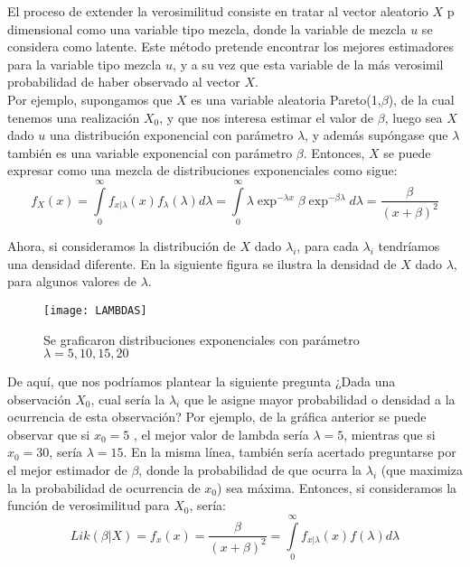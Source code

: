 \documentclass[11pt]{book}
\begin{document}
El proceso de extender la verosimilitud consiste en tratar al vector aleatorio $X$ p dimensional como una variable tipo mezcla, donde la variable de mezcla $u$ se considera como latente. Este método pretende encontrar los mejores estimadores para la variable tipo mezcla $u$, y a su vez que esta variable de la más verosimil probabilidad de haber observado al vector $X$.\\ 

\pagebreak
Por ejemplo, supongamos que $X$ es una variable aleatoria Pareto(1,$\beta$), de la cual tenemos  una realización $X_{0} $, y que nos interesa estimar el valor de $ \beta$, luego sea $X$ dado $u$ una distribución exponencial con parámetro $\lambda$, y además supóngase que $ \lambda$ también es una variable exponencial con parámetro $\beta $. Entonces, $X$ se puede expresar como una mezcla de distribuciones exponenciales como sigue:\\
\begin{equation*}
f_{X}(x)=\underset{0}{\overset{\infty }{\int }}f_{x|\lambda}(x)f_{\lambda}(\lambda)d\lambda=\underset{0}{\overset{\infty }{\int }} \lambda \exp^{-\lambda x} \beta \exp^{-\beta \lambda} d\lambda=\dfrac{\beta}{(x+\beta)^{2}}
\end{equation*}


Ahora, si consideramos la distribución de $ X$ dado $\lambda_{i}$, para cada $\lambda_{i}$ tendríamos una densidad diferente. En la siguiente figura se ilustra la densidad de $X$ dado $\lambda$, para algunos valores de $ \lambda$.\\

\begin{figure}[h]
\centering
\texttt{[image: LAMBDAS]}
\caption{Se graficaron distribuciones exponenciales con parámetro $\lambda=5, 10, 15, 20$}
\end{figure}

De aquí, que nos podríamos plantear la siguiente pregunta ¿Dada una observación $ X_0$, cual sería la $ \lambda_{i}$ que le asigne mayor probabilidad o densidad a la ocurrencia de esta observación? Por ejemplo, de la gráfica anterior se puede observar que si $x_{0}=5$ , el mejor valor de lambda sería $\lambda=5$, mientras que si $x_{0}=30$, sería $\lambda=15$. En la misma línea, también sería acertado preguntarse por el mejor estimador de $\beta$, donde la probabilidad de que ocurra la $\lambda_{i}$ (que maximiza la la probabilidad de ocurrencia de $x_{0}$) sea máxima. Entonces, si consideramos la función de verosimilitud para $X_{0}$, sería:\\
\begin{equation*}
 Lik(\beta|X)=f_{x}(x)=\dfrac{\beta}{(x+\beta)^{2}}=\underset{0}{\overset{\infty }{\int }}f_{x|\lambda}(x)f(\lambda)d\lambda
\end{equation*}
\end{document}
